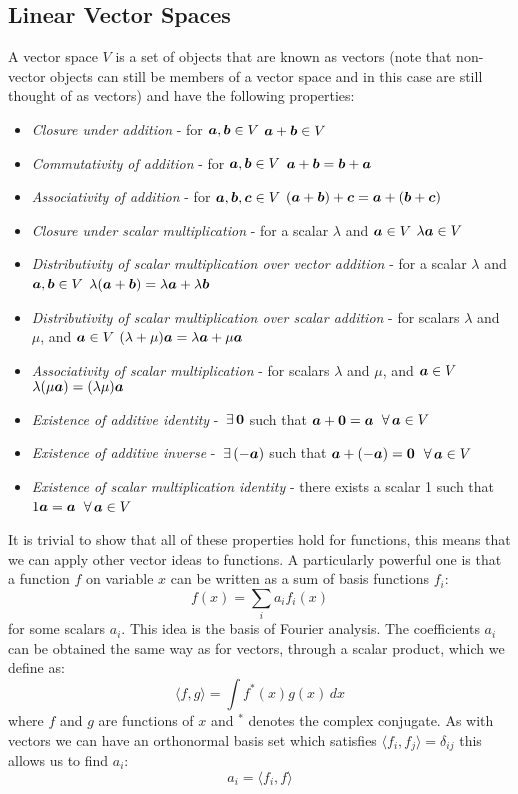 \documentclass{article}
\begin{document}
    \subsection{Linear Vector Spaces}
    A vector space \(V\) is a set of objects that are known as vectors (note that non-vector objects can still be members of a vector space and in this case are still thought of as vectors) and have the following properties:
    \begin{itemize}
        \item \emph{Closure under addition} - for \(\bm{a}, \bm{b}\in V\) \(\bm{a} + \bm{b}\in V\)
        \item \emph{Commutativity of addition} - for \(\bm{a}, \bm{b}\in V\) \(\bm{a}+ \bm{b} = \bm{b} + \bm{a}\)
        \item \emph{Associativity of addition} - for \(\bm{a}, \bm{b}, \bm{c}\in V\) \((\bm{a} + \bm{b}) + \bm{c} = \bm{a} + (\bm{b} + \bm{c})\)
        \item \emph{Closure under scalar multiplication} - for a scalar \(\lambda\) and \(\bm{a}\in V\) \(\lambda \bm{a}\in V\)
        \item \emph{Distributivity of scalar multiplication over vector addition} - for a scalar \(\lambda\) and \(\bm{a}, \bm{b}\in V\) \(\lambda(\bm{a} + \bm{b}) = \lambda\bm{a} + \lambda \bm{b}\)
        \item \emph{Distributivity of scalar multiplication over scalar addition} - for scalars \(\lambda\) and \(\mu\), and \(\bm{a}\in V\) \((\lambda + \mu)\bm{a} = \lambda \bm{a} + \mu\bm{a}\)
        \item \emph{Associativity of scalar multiplication} - for scalars \(\lambda\) and \(\mu\), and \(\bm{a}\in V\) \(\lambda(\mu\bm{a}) = (\lambda\mu)\bm{a}\)
        \item \emph{Existence of additive identity} - \(\,\exists\, \bm{0}\) such that \(\bm{a} + \bm{0} = \bm{a}\) \(\,\forall\, \bm{a}\in V\)
        \item \emph{Existence of additive inverse} - \(\,\exists\, (-\bm{a})\) such that \(\bm{a} + (-\bm{a}) = \bm{0}\) \(\,\forall\, \bm{a}\in V\)
        \item \emph{Existence of scalar multiplication identity} - there exists a scalar 1 such that \(1\bm{a} = \bm{a}\) \(\,\forall\, \bm{a}\in V\)
    \end{itemize}
    It is trivial to show that all of these properties hold for functions, this means that we can apply other vector ideas to functions.
    A particularly powerful one is that a function \(f\) on variable \(x\) can be written as a sum of basis functions \(f_i\):
    \[f(x) = \sum_i a_if_i(x)\]
    for some scalars \(a_i\). 
    This idea is the basis of Fourier analysis.
    The coefficients \(a_i\) can be obtained the same way as for vectors, through a scalar product, which we define as:
    \[\langle f, g\rangle = \int f^*(x)g(x)\,dx\]
    where \(f\) and \(g\) are functions of \(x\) and \(^*\) denotes the complex conjugate.
    As with vectors we can have an orthonormal basis set which satisfies
    \(\langle f_i, f_j\rangle = \delta_{ij}\)
    this allows us to find \(a_i\):
    \[a_i = \langle f_i, f\rangle\]
    
\end{document}

